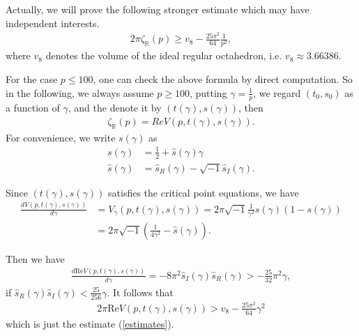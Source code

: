 \documentclass[12pt]{amsart}
\begin{document}
Actually, we will prove the following stronger estimate which may have independent interests.
\begin{align} \label{estimates}
    2\pi \zeta_{\mathbb{R}}(p)\geq v_8-\frac{25\pi^2}{64}\frac{1}{p^2},
\end{align}
where $v_8$ denotes the volume of the ideal regular octahedron, i.e. $v_8\approx 3.66386$.

For the case $p\leq 100$, one can check the above formula by direct computation.  So in the following, we always assume $p\geq 100$, putting $\gamma=\frac{1}{p}$, we regard $(t_0,s_0)$ as a function of $\gamma$, and the denote it by $(t(\gamma),s(\gamma))$,  then 
\begin{align}
    \zeta_{\mathbb{R}}(p)=Re V(p,t(\gamma),s(\gamma)). 
\end{align}
For convenience, we write $s(\gamma)$ as
\begin{align}
    s(\gamma)&=\frac{1}{2}+\widehat{s}(\gamma)\gamma\\\nonumber
    \widehat{s}(\gamma)&=\widehat{s}_R(\gamma)-\sqrt{-1}\widehat{s}_I(\gamma).
\end{align}

Since $(t(\gamma),s(\gamma))$ satisfies the critical point equations, we have
\begin{align}
\frac{dV(p,t(\gamma),s(\gamma))}{d\gamma}&=V_\gamma(p,t(\gamma),s(\gamma))=2\pi\sqrt{-1}\frac{1}{\gamma^2}s(\gamma)(1-s(\gamma))\\\nonumber
&=2\pi\sqrt{-1}\left(\frac{1}{4\gamma^2}-\widehat{s}(\gamma)\right).  
\end{align}


Then we have
\begin{align}
\frac{d\text{Re}V(p,t(\gamma),s(\gamma))}{d\gamma}=-8\pi^2 \widehat{s}_I(\gamma) \widehat{s}_R(\gamma)>-\frac{25}{32}\pi^2\gamma,   
\end{align}
if $ \widehat{s}_{R}(\gamma)\widehat{s}_{I}(\gamma)<\frac{25}{256}\gamma $. It follows that
\begin{align}
2\pi \text{Re}V(p,t(\gamma),s(\gamma))>v_8-\frac{25\pi^2}{64}\gamma^2
\end{align}
which is just the estimate (\ref{estimates}). 
\end{document}
